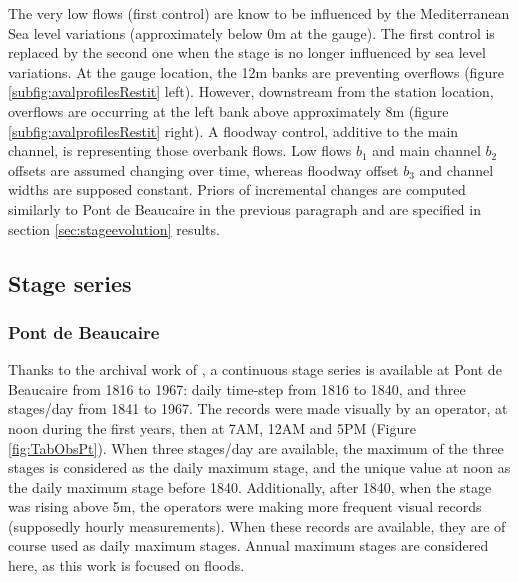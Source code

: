 \documentclass[11pt]{article}
\begin{document}
        The very low flows (first control) are know to be influenced by the Mediterranean Sea level variations (approximately below 0m at the gauge). The first control is replaced by the second one when the stage is no longer influenced by sea level variations. At the gauge location, the 12m banks are preventing overflows (figure \ref{subfig:avalprofilesRestit} left). However, downstream from the station location, overflows are occurring at the left bank above approximately 8m (figure \ref{subfig:avalprofilesRestit} right). A floodway control, additive to the main channel, is representing those overbank flows. Low flows $b_1$ and main channel $b_2$ offsets are assumed changing over time, whereas floodway offset $b_3$ and channel widths are supposed constant. Priors of incremental changes are computed similarly to Pont de Beaucaire in the previous paragraph and are specified in section \ref{sec:stageevolution} results.
        
    \subsection{Stage series}

    \subsubsection{Pont de Beaucaire}
    
    Thanks to the archival work of \citet{pichard_hydro-climatology_2017}, a continuous stage series is available at Pont de Beaucaire from 1816 to 1967: daily time-step from 1816 to 1840, and three stages/day from 1841 to 1967. The records were made visually by an operator, at noon during the first years, then at 7AM, 12AM and 5PM (Figure \ref{fig:TabObsPt}). When three stages/day are available, the maximum of the three stages is considered as the daily maximum stage, and the unique value at noon as the daily maximum stage before 1840. Additionally, after 1840, when the stage was rising above 5m, the operators were making more frequent visual records (supposedly hourly measurements). When these records are available, they are of course used as daily maximum stages. Annual maximum stages are considered here, as this work is focused on floods. 
    
\end{document}
